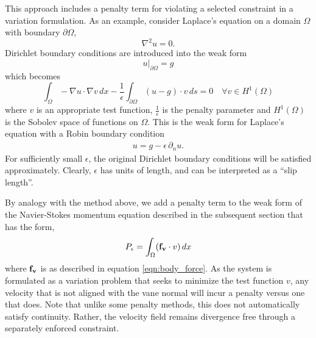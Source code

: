 This approach includes a penalty term for violating a selected
constraint in a variation formulation. As an example, consider Laplace's 
equation on a domain $\Omega$ with boundary $\partial\Omega$, 
\begin{equation}
 \nabla^2 u = 0. 
\end{equation}
Dirichlet boundary conditions are introduced into the weak form
\begin{equation}
 u|_{\partial \Omega} = g
\end{equation}
which becomes 
\begin{equation}
\int_{\Omega}  - \nabla u \cdot \nabla v \, dx - \frac{1}{\epsilon}
 \int_{\partial \Omega} (u-g) \cdot v \, ds = 0 \quad \forall v \in H^1(\Omega)
\end{equation}
where $v$ is an appropriate test function, $\frac{1}{\epsilon}$ is the
penalty parameter and $H^1(\Omega)$ is the Sobolev space of functions on
$\Omega$. This is the weak form for Laplace's equation with a Robin boundary condition 
\begin{align}
 u = g - \epsilon \, \partial_n u. 
\end{align}
For sufficiently small $\epsilon$, the original Dirichlet boundary
conditions will be satisfied approximately. Clearly, $\epsilon$ has
units of length, and can be interpreted as a ``slip length''. 

%
%
%
%
%

By analogy with the method above, we add a penalty term to the weak
form of the Navier-Stokes momentum equation described in the subsequent
section %
that has the form, 
\begin{equation}
P_\epsilon = \int_\Omega ({\bf f_v} \cdot v) \, dx
\end{equation}
where ${\bf f_v}$ is as described in equation \ref{eqn:body_force}. 
As the system is formulated as a variation problem that seeks to
minimize the test function $v$, any velocity that is not aligned with
the vane normal will incur a penalty versus one that does. Note that unlike
some penalty methods, this does not automatically satisfy
continuity. Rather, the velocity field remains divergence free through a
separately enforced constraint.  

